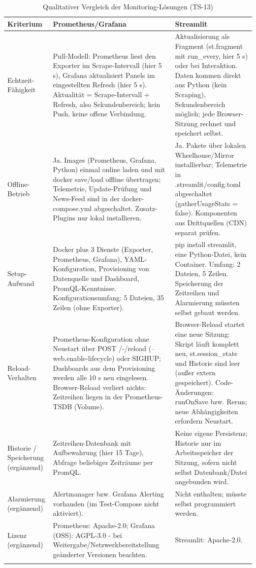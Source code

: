 \begin{table}[htbp]
\centering
\footnotesize
\caption{Qualitativer Vergleich der Monitoring-Lösungen (TS-13)}
\label{tab:ts13-monitoring}
\begin{tabular}{>{\raggedright\arraybackslash}p{2.4cm}>{\raggedright\arraybackslash}p{5.4cm}>{\raggedright\arraybackslash}p{5.4cm}}
\toprule
\textbf{Kriterium} & \textbf{Prometheus/Grafana} & \textbf{Streamlit} \\
\midrule
Echtzeit-Fähigkeit & Pull-Modell: Prometheus liest den Exporter im Scrape-Intervall (hier 5 s), Grafana aktualisiert Panels im eingestellten Refresh (hier 5 s). Aktualität = Scrape-Intervall + Refresh, also Sekundenbereich; kein Push, keine offene Verbindung. & Aktualisierung als Fragment (st.fragment mit run\_every, hier 5 s) oder bei Interaktion. Daten kommen direkt aus Python (kein Scraping), Sekundenbereich möglich; jede Browser-Sitzung rechnet und speichert selbst. \\
\addlinespace
Offline-Betrieb & Ja. Images (Prometheus, Grafana, Python) einmal online laden und mit docker save/load offline übertragen; Telemetrie, Update-Prüfung und News-Feed sind in der docker-compose.yml abgeschaltet. Zusatz-Plugins nur lokal installieren. & Ja. Pakete über lokalen Wheelhouse/Mirror installierbar; Telemetrie in .streamlit/config.toml abgeschaltet (gatherUsageStats = false). Komponenten aus Drittquellen (CDN) separat prüfen. \\
\addlinespace
Setup-Aufwand & Docker plus 3 Dienste (Exporter, Prometheus, Grafana), YAML-Konfiguration, Provisioning von Datenquelle und Dashboard, PromQL-Kenntnisse. Konfigurationsumfang: 5 Dateien, 35 Zeilen (ohne Exporter). & pip install streamlit, eine Python-Datei, kein Container. Umfang: 2 Dateien, 5 Zeilen. Speicherung der Zeitreihen und Alarmierung müssten selbst gebaut werden. \\
\addlinespace
Reload-Verhalten & Prometheus-Konfiguration ohne Neustart über POST /-/reload (--web.enable-lifecycle) oder SIGHUP; Dashboards aus dem Provisioning werden alle 10 s neu eingelesen. Browser-Reload verliert nichts: Zeitreihen liegen in der Prometheus-TSDB (Volume). & Browser-Reload startet eine neue Sitzung: Skript läuft komplett neu, st.session\_state und Historie sind leer (außer extern gespeichert). Code-Änderungen: runOnSave bzw. Rerun; neue Abhängigkeiten erfordern Neustart. \\
\addlinespace
Historie / Speicherung (ergänzend) & Zeitreihen-Datenbank mit Aufbewahrung (hier 15 Tage), Abfrage beliebiger Zeiträume per PromQL. & Keine eigene Persistenz; Historie nur im Arbeitsspeicher der Sitzung, sofern nicht selbst Datenbank/Datei angebunden wird. \\
\addlinespace
Alarmierung (ergänzend) & Alertmanager bzw. Grafana Alerting vorhanden (im Test-Compose nicht aktiviert). & Nicht enthalten; müsste selbst programmiert werden. \\
\addlinespace
Lizenz (ergänzend) & Prometheus: Apache-2.0; Grafana (OSS): AGPL-3.0 - bei Weitergabe/Netzwerkbereitstellung geänderter Versionen beachten. & Streamlit: Apache-2.0. \\
\addlinespace
\bottomrule
\end{tabular}
\end{table}
